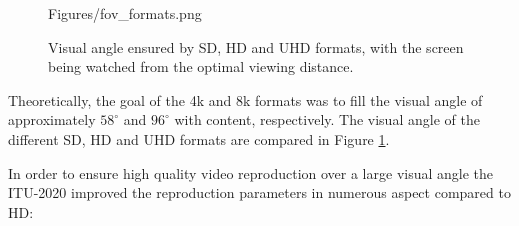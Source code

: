 \begin{figure}[]
	\centering
	\begin{overpic}[width = 0.85 \columnwidth ]{Figures/fov_formats.png}
	\small
	\end{overpic}
	\caption{Visual angle ensured by SD, HD and UHD formats, with the screen being watched from the optimal viewing distance.}
	\label{Fig:fov_formats}
\end{figure}

Theoretically, the goal of the 4k and 8k formats was to fill the visual angle of approximately $58^{\circ}$ and $96^{\circ}$ with content, respectively.
The visual angle of the different SD, HD and UHD formats are compared in Figure \ref{Fig:fov_formats}.

In order to ensure high quality video reproduction over a large visual angle the ITU-2020 improved the reproduction parameters in numerous aspect compared to HD:

